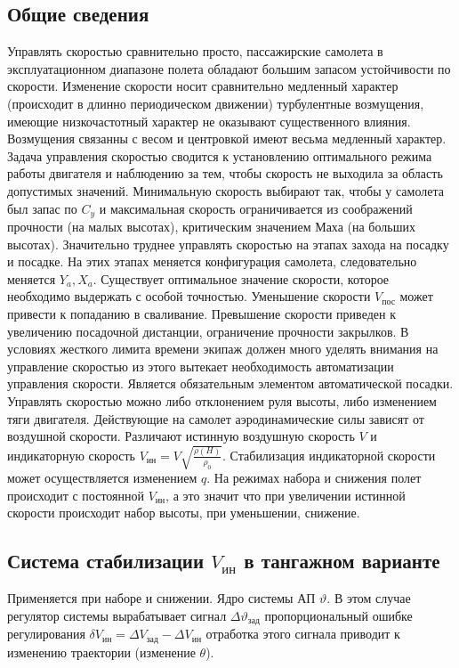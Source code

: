 \documentclass{article}
\begin{document}
\subsection{Общие сведения}
Управлять скоростью сравнительно просто, пассажирские самолета в
эксплуатационном диапазоне полета обладают большим запасом устойчивости по
скорости. Изменение скорости носит сравнительно медленный характер (происходит
в длинно периодическом движении) турбулентные возмущения, имеющие
низкочастотный характер не оказывают существенного влияния.
Возмущения связанны с весом и центровкой имеют весьма медленный характер.
Задача управления скоростью сводится к установлению оптимального режима работы
двигателя и наблюдению за тем, чтобы скорость не выходила за область допустимых
значений.
Минимальную скорость выбирают так, чтобы у самолета был запас по $C_y$ и
максимальная скорость ограничивается из соображений прочности (на малых
высотах), критическим значением Маха (на больших высотах).
Значительно труднее управлять скоростью на этапах захода на посадку и посадке.
На этих этапах меняется конфигурация самолета, следовательно меняется $Y_a,
	X_a$.
Существует оптимальное значение скорости, которое необходимо выдержать с особой
точностью. Уменьшение скорости $V_\text{пос}$ может привести к попаданию в
сваливание. Превышение скорости приведен к увеличению посадочной дистанции,
ограничение прочности закрылков. В условиях жесткого лимита времени экипаж
должен много уделять внимания на управление скоростью из этого вытекает
необходимость автоматизации управления скорости. Является обязательным
элементом автоматической посадки.\\
Управлять скоростью можно либо отклонением руля высоты, либо изменением тяги
двигателя. Действующие на самолет аэродинамические силы зависят от воздушной
скорости. Различают истинную воздушную скорость $V$ и индикаторную скорость
$V_\text{ин} = V \sqrt{\frac{\rho(H)}{\rho_0}}$. Стабилизация индикаторной
скорости может осуществляется изменением $q$. На режимах набора и снижения полет
происходит с постоянной $ V_\text{ин} $, а это значит что при увеличении
истинной скорости происходит набор высоты, при уменьшении, снижение.

\subsection{Система стабилизации \texorpdfstring{$ V_\text{ин}$}{Lg} в
	тангажном варианте}
Применяется при наборе и снижении. Ядро системы АП $\vartheta$. В этом случае
регулятор системы вырабатывает сигнал $\Delta \vartheta_\text{зад}$
пропорциональный ошибке регулирования $\delta V_\text{ин} = \Delta V_\text{зад}
	- \Delta V_\text{ин}$ отработка этого сигнала приводит к изменению траектории
(изменение $\theta$).
\end{document}
